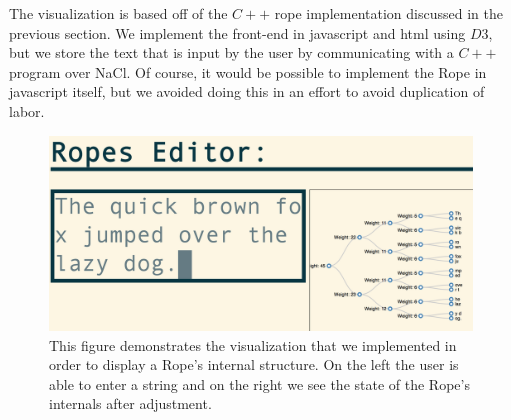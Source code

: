 \documentclass[12pt]{article}
\begin{document}
The visualization is based off of the $C++$ rope implementation discussed in the previous section. We implement the front-end in javascript and html using $D3$, but we store the text that is input by the user by communicating with a $C++$ program over NaCl. Of course, it would be possible to implement the Rope in javascript itself, but we avoided doing this in an effort to avoid duplication of labor.

\begin{figure}[t]
\begin{centering}
\includegraphics[scale=0.35]{editorImage1}
\caption{This figure demonstrates the visualization that we implemented in order to display a Rope's internal structure. On the left the user is able to enter a string and on the right we see the state of the Rope's internals after adjustment.}\label{editor}

\end{centering}
\end{figure}

\end{document}
